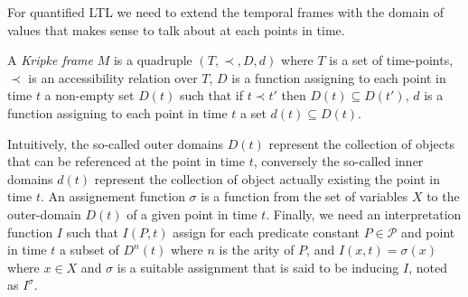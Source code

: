 For quantified LTL we need to extend the temporal frames with the domain of values that makes sense to talk about at
each points in time.

\begin{definition}
  A \emph{Kripke frame} $M$ is a quadruple $(T, \prec, D, d)$ where $T$ is a set of time-points, $\prec$ is an
  accessibility relation over $T$, $D$ is a function assigning to each point in time $t$ a non-empty set $D(t)$ such that
  if $t \prec t'$ then $D(t) \subseteq D(t')$, $d$ is a function assigning to each point in time $t$ a set $d(t)
  \subseteq D(t)$.
\end{definition}
Intuitively, the so-called outer domains $D(t)$ represent the collection of objects that can be referenced at the point
in time $t$, conversely the so-called inner domains $d(t)$ represent the collection of object actually existing the
point in time $t$. An assignement function $\sigma$ is a function from the set of variables $X$ to the outer-domain
$D(t)$ of a given point in time $t$. Finally, we need an interpretation function $I$ such that $I(P, t)$ assign for each
predicate constant $P \in \mathcal{P}$ and point in time $t$ a subset of $D^n(t)$ where $n$ is the arity of $P$, and
$I(x, t) = \sigma(x)$ where $x \in X$ and $\sigma$ is a suitable assignment that is said to be inducing $I$, noted as
$I^\sigma$.

